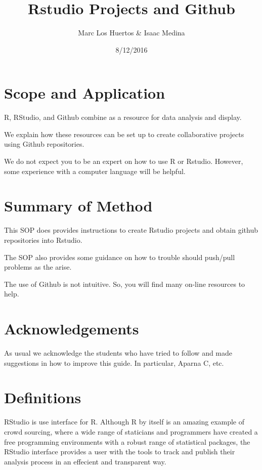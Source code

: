 \documentclass[12pt]{../SOP3_beta}
\author{Marc Los Huertos \& Isaac Medina}
\title{Rstudio Projects and Github}
\date{8/12/2016}
\begin{document}

\maketitle

\section{Scope and Application}

\NP R, RStudio, and Github combine as a resource for data analysis and display.

\NP We explain how these resources can be set up to create collaborative projects using Github repositories. 

\NP We do not expect you to be an expert on how to use R or Rstudio. However, some experience with a computer language will be helpful. 

\section{Summary of Method}

\NP This SOP does provides instructions to create Rstudio projects and obtain github repositories into Rstudio. 

\NP The SOP also provides some guidance on how to trouble should push/pull problems as the arise.

\NP The use of Github is not intuitive. So, you will find many on-line resources to help.

\tableofcontents

\newpage

\section{Acknowledgements}

As usual we acknowledge the students who have tried to follow and made suggestions in how to improve this guide. In particular, Aparna C, etc.

\section{Definitions}

\NP RStudio is use interface for R. Although R by itself is an amazing example of crowd sourcing, where a wide range of staticians and programmers have created a free programming environments with a robust range of statistical packages, the RStudio interface provides a user with the tools to track and publish their analysis process in an effecient and transparent way. 
\end{document}
